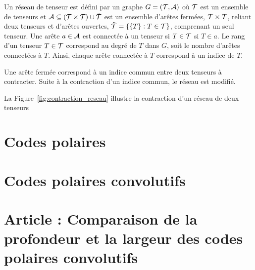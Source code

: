 Un réseau de tenseur est défini par un graphe $G = (\mathcal{T}, \mathcal{A})$ où $\mathcal{T}$ 
est un ensemble de tenseurs et $\mathcal{A} \subseteq (\mathcal{T} \times \mathcal{T}) \cup \tilde{\mathcal{T}}$ 
est un ensemble d'arêtes fermées, $\mathcal{T} \times \mathcal{T}$, reliant deux tenseurs 
et d'arêtes ouvertes, $\tilde {\mathcal{T}} = \qty{\qty{T} : T \in \mathcal{T}}$, comprenant un seul tenseur.
Une arête $a \in \mathcal{A}$ est connectée à un tenseur si $T \in \mathcal{T}$ si $T \in a$.
Le rang d'un tenseur $T \in \mathcal{T}$ correspond au degré de $T$ dans $G$,
soit le nombre d'arêtes connectées à $T$.
Ainsi, chaque arête connectée à $T$ correspond à un indice de $T$.

Une arête fermée correspond à un indice commun entre deux tenseurs à contracter.
Suite à la contraction d'un indice commun,
le réseau est modifié.



La Figure~\ref{fig:contraction_reseau} illustre la contraction d'un réseau de deux tenseurs





\section{Codes polaires}
\label{sec:codes_polaires}

\section{Codes polaires convolutifs}
\label{sec:codes_polaires_conv}

\section{Article : Comparaison de la profondeur et la largeur des codes polaires convolutifs}
